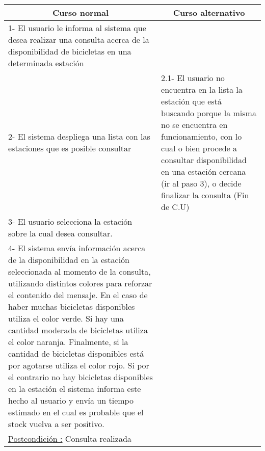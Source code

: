 \begin{center}
    \centering
    \begin{tabular}{ | p{11cm} | p{6cm} | }
    	\multicolumn{1}{c}{\cellcolor{black!30}\textbf{Curso normal}} & 
    	\multicolumn{1}{c}{\cellcolor{black!30}\textbf{Curso alternativo}} \\
		\hline
		1- El usuario le informa al sistema que desea realizar una consulta acerca de la disponibilidad
		de bicicletas en una determinada estación & \\ \hline
		2- El sistema despliega una lista con las estaciones que es posible consultar & 
		2.1- El usuario no encuentra en la lista la estación que está buscando porque la misma no se encuentra en
		funcionamiento, con lo cual o bien procede a consultar disponibilidad en una estación cercana (ir al paso 3), o
		decide finalizar la consulta (Fin de C.U)\\ \hline
		3- El usuario selecciona la estación sobre la cual desea consultar. & \\ \hline
		4- El sistema envía información acerca de la disponibilidad en la estación seleccionada al momento de la consulta, utilizando distintos colores para reforzar el contenido del mensaje. En el caso de haber muchas bicicletas disponibles utiliza el color verde. Si hay una cantidad moderada de bicicletas utiliza el color naranja. Finalmente,
		si la cantidad de bicicletas disponibles está por agotarse utiliza el color rojo. Si por el contrario no hay
		bicicletas disponibles en la estación el sistema informa este hecho al usuario y envía un tiempo estimado en el cual
		es probable que el stock vuelva a ser positivo. & \\ \hline
		\underline{Postcondición :} Consulta realizada & \\ \hline
    \end{tabular}
\end{center}	

~

